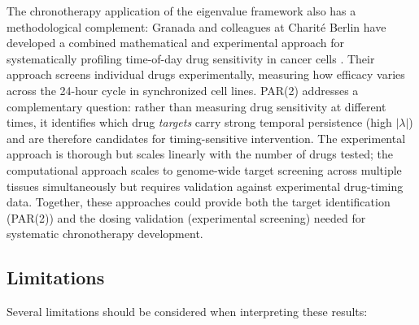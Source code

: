 \documentclass[11pt,letterpaper]{article}
\begin{document}
The chronotherapy application of the eigenvalue framework also has a methodological complement: Granada and colleagues at Charit\'e Berlin have developed a combined mathematical and experimental approach for systematically profiling time-of-day drug sensitivity in cancer cells \citep{granada2024phenotyping, granada2025drivers}. Their approach screens individual drugs experimentally, measuring how efficacy varies across the 24-hour cycle in synchronized cell lines. PAR(2) addresses a complementary question: rather than measuring drug sensitivity at different times, it identifies which drug \textit{targets} carry strong temporal persistence (high $|\lambda|$) and are therefore candidates for timing-sensitive intervention. The experimental approach is thorough but scales linearly with the number of drugs tested; the computational approach scales to genome-wide target screening across multiple tissues simultaneously but requires validation against experimental drug-timing data. Together, these approaches could provide both the target identification (PAR(2)) and the dosing validation (experimental screening) needed for systematic chronotherapy development.

\subsection{Limitations}

Several limitations should be considered when interpreting these results:
\end{document}
